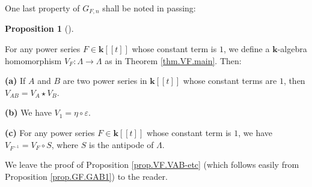 \documentclass[numbers=enddot,12pt,final,onecolumn,notitlepage]{scrartcl}%
\theoremstyle{definition}
\newtheorem{prop}[theo]{Proposition}
\newenvironment{proposition}[1][]
{\begin{prop}[#1]\begin{leftbar}}
{\end{leftbar}\end{prop}}
\begin{document}
One last property of $G_{F,n}$ shall be noted in passing:

\begin{proposition}
\label{prop.VF.VAB-etc}For any power series $F\in\mathbf{k}\left[  \left[
t\right]  \right]  $ whose constant term is $1$, we define a $\mathbf{k}%
$-algebra homomorphism $V_{F}:\Lambda\rightarrow\Lambda$ as in Theorem
\ref{thm.VF.main}. Then:

\textbf{(a)} If $A$ and $B$ are two power series in $\mathbf{k}\left[  \left[
t\right]  \right]  $ whose constant terms are $1$, then $V_{AB}=V_{A}\star
V_{B}$.

\textbf{(b)} We have $V_{1}=\eta\circ\varepsilon$.

\textbf{(c)} For any power series $F\in\mathbf{k}\left[  \left[  t\right]
\right]  $ whose constant term is $1$, we have $V_{F^{-1}}=V_{F}\circ S$,
where $S$ is the antipode of $\Lambda$.
\end{proposition}

We leave the proof of Proposition \ref{prop.VF.VAB-etc} (which follows easily
from Proposition \ref{prop.GF.GAB1}) to the reader.
\end{document}
